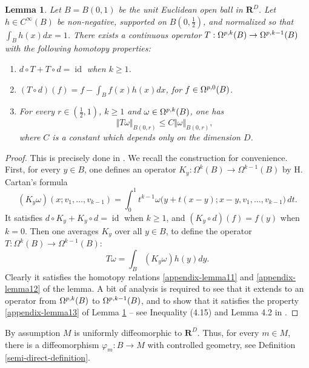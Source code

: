 \documentclass[JEP,XML,SOM,Unicode,published]{cedram}
\newcommand{\NoChangel}[1]{%
\expandafter\let\csname old\string#1\endcsname=#1
\let#1=\relax
\newcommand{#1}{\mathcode`l="716C\csname old\string#1\endcsname\mathcode`l="7160 }%
}
\newcommand{\loc}{\mathrm{loc}}\NoChangel{\loc}
\newcommand{\RR}{\mathbf{R}}
\theoremstyle{plain}
\newtheorem{lemma}[equation]{Lemma}
\theoremstyle{remark}
\theoremstyle{definition}
\DeclareMathOperator{\id}{id}
\begin{document}
\begin{lemma}\label{appendix-lemma1}
Let $B = B(0,1)$ be the unit Euclidean open ball in $\RR^D$. Let $h \in C^\infty (B)$ be non-negative,
supported on $B(0, \frac{1}{2})$, and normalized so that $\int_B h(x)dx =1$. There exists a continuous
operator $T: \Omega_{\loc}^{p,k}(B) \to \Omega_{\loc}^{p,k-1}(B)$ with the following homotopy
properties:
\begin{enumerate}
\item\label{appendix-lemma11} $d \circ T + T \circ d = \id$ when $k \geqslant 1$.
\item\label{appendix-lemma12} $(T \circ d)(f) = f -\int_B f(x)h(x) dx$, for $f \in \Omega_{\loc}^{p,0}(B)$.
\item \label{appendix-lemma13}For every $r \in (\frac{1}{2}, 1)$, $k \geqslant 1$ and $\omega \in \Omega_{\loc}^{p, k}(B)$, one has
\[\Vert T \omega \Vert_{B(0,r)} \leqslant C \Vert \omega \Vert_{B(0,r)},\] where $C$ is a constant
which depends only on the dimension $D$.
\end{enumerate}
\end{lemma}
\begin{proof} This is precisely done in \cite[\S 4]{IL93}. We recall the construction for convenience.
First, for every $y \in B$, one defines an operator $K_y: \Omega^k(B) \to \Omega^{k-1}(B)$ by H.\,Cartan's
formula
\[(K_y \omega)(x; v_1, \dots, v_{k-1}) = \int_0^1 t^{k-1} \omega\bigl(y+t(x-y); x-y, v_1, \dots, v_{k-1}\bigr)\,dt.\]
It satisfies $d \circ K_y + K_y \circ d = \id$ when $k\geqslant 1$, and $(K_y \circ d)(f) = f(y)$ when $k=0$.
Then one averages $K_y$ over all $y \in B$, to define the operator $T: \Omega^k(B) \to \Omega^{k-1}(B)$:
\[T\omega = \int_B (K_y\omega)h(y)dy.\]
Clearly it satisfies the homotopy relations \eqref{appendix-lemma11} and \eqref{appendix-lemma12} of the lemma. A bit of analysis is required
to see that it extends to an operator from $\Omega_{\loc}^{p,k}(B)$ to $\Omega_{\loc}^{p,k-1}(B)$,
and to show that it satisfies the property \eqref{appendix-lemma13} of Lemma \ref{appendix-lemma1} --
see Inequality (4.15) and Lemma 4.2 in \cite{IL93}.
\end{proof}

By assumption $M$ is uniformly diffeomorphic to $\RR^D$. Thus, for every $m \in M$, there is a diffeomorphism
$\varphi_m: B \to M$ with controlled geometry, see Definition \ref{semi-direct-definition}.
\end{document}
